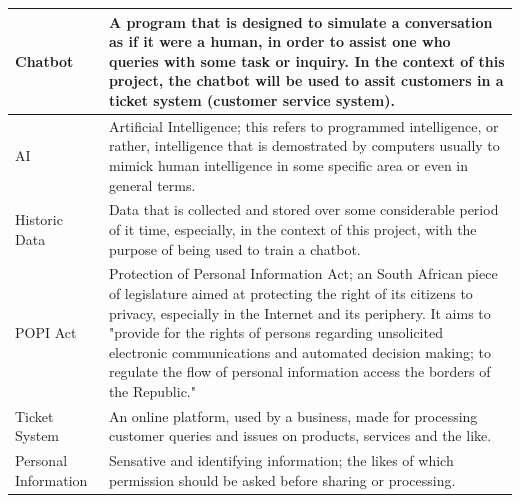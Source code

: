 \documentclass[11pt]{article}
\begin{document}
\begin{tabular}{ |p{2cm}|p{14.7cm}| }
	\hline
	Chatbot              & A program that is designed to simulate a conversation as if it were a human, in order to assist one who queries with some task or inquiry. In the context of this project, the chatbot will be used to assit customers in a ticket system (customer service system).                                                                                                                                                     \\
	\hline
	AI                   & Artificial Intelligence;  this refers to programmed intelligence, or rather, intelligence that is demostrated by computers usually to mimick human intelligence in some specific area or even in general terms.                                                                                                                                                                                                          \\
	\hline
	Historic Data        & Data that is collected and stored over some considerable period of it time, especially, in the context of this project, with the purpose of being used to train a chatbot.                                                                                                                                                                                                                                               \\
	\hline
	POPI Act             & Protection of Personal Information Act; an South African piece of legislature aimed at protecting the right of its citizens to privacy, especially in the Internet and its periphery. It aims to "provide for the rights of persons regarding unsolicited electronic communications and automated decision making; to regulate the flow of personal information access the borders of the Republic."\cite{Legislature:1} \\
	\hline
	Ticket System        & An online platform, used by a business, made for processing customer queries and issues on products, services and the like.                                                                                                                                                                                                                                                                                              \\
	\hline
	Personal Information & Sensative and identifying information; the likes of which permission should be asked before sharing or processing.                                                                                                                                                                                                                                                                                                       \\

\end{tabular}
\end{document}
